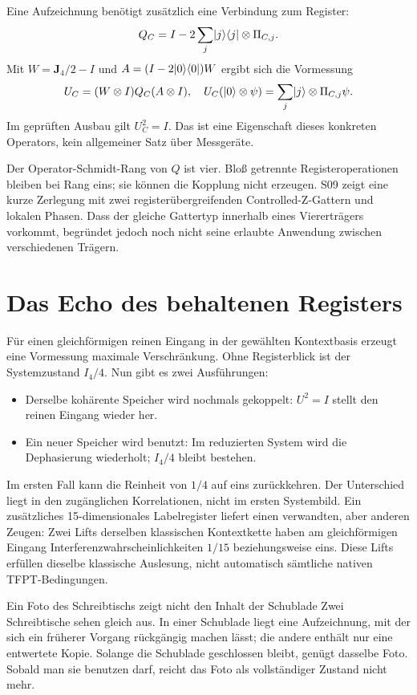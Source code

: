 Eine Aufzeichnung benötigt zusätzlich eine Verbindung zum Register:
\begin{equation}
Q_C=I-2\sum_j\lvert j\rangle\langle j\rvert\otimes\Pi_{C,j}.
\end{equation}
Mit $W=\mathbf J_4/2-I$ und $A=(I-2\lvert0\rangle\langle0\rvert)W$ ergibt sich die Vormessung
\begin{equation}
U_C=(W\otimes I)Q_C(A\otimes I),\quad
U_C(\lvert0\rangle\otimes\psi)=\sum_j\lvert j\rangle\otimes\Pi_{C,j}\psi.
\label{eq:record}
\end{equation}
Im geprüften Ausbau gilt $U_C^2=I$. Das ist eine Eigenschaft dieses konkreten Operators, kein allgemeiner Satz über Messgeräte.

Der Operator-Schmidt-Rang von $Q$ ist vier. Bloß getrennte Registeroperationen bleiben bei Rang eins; sie können die Kopplung nicht erzeugen. S09 zeigt eine kurze Zerlegung mit zwei registerübergreifenden Controlled-Z-Gattern und lokalen Phasen. Dass der gleiche Gattertyp innerhalb eines Viererträgers vorkommt, begründet jedoch noch nicht seine erlaubte Anwendung zwischen verschiedenen Trägern.

\section{Das Echo des behaltenen Registers}
Für einen gleichförmigen reinen Eingang in der gewählten Kontextbasis erzeugt eine Vormessung maximale Verschränkung. Ohne Registerblick ist der Systemzustand $I_4/4$. Nun gibt es zwei Ausführungen:
\begin{itemize}
\item Derselbe kohärente Speicher wird nochmals gekoppelt: $U^2=I$ stellt den reinen Eingang wieder her.
\item Ein neuer Speicher wird benutzt: Im reduzierten System wird die Dephasierung wiederholt; $I_4/4$ bleibt bestehen.
\end{itemize}
Im ersten Fall kann die Reinheit von $1/4$ auf eins zurückkehren. Der Unterschied liegt in den zugänglichen Korrelationen, nicht im ersten Systembild. Ein zusätzliches 15-dimensionales Labelregister liefert einen verwandten, aber anderen Zeugen: Zwei Lifts derselben klassischen Kontextkette haben am gleichförmigen Eingang Interferenzwahrscheinlichkeiten $1/15$ beziehungsweise eins. Diese Lifts erfüllen dieselbe klassische Auslesung, nicht automatisch sämtliche nativen TFPT-Bedingungen. 

\begin{bild}{Ein Foto des Schreibtischs zeigt nicht den Inhalt der Schublade}
Zwei Schreibtische sehen gleich aus. In einer Schublade liegt eine Aufzeichnung, mit der sich ein früherer Vorgang rückgängig machen lässt; die andere enthält nur eine entwertete Kopie. Solange die Schublade geschlossen bleibt, genügt dasselbe Foto. Sobald man sie benutzen darf, reicht das Foto als vollständiger Zustand nicht mehr.
\end{bild}

